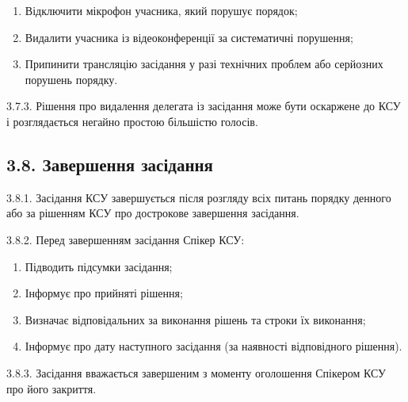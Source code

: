         \begin{enumerate}[label=\alph*)]
            \item Відключити мікрофон учасника, який порушує порядок;
            \item Видалити учасника із відеоконференції за систематичні порушення;
            \item Припинити трансляцію засідання у разі технічних проблем або серйозних порушень порядку.
        \end{enumerate}

    3.7.3. Рішення про видалення делегата із засідання може бути оскаржене до КСУ і розглядається негайно простою більшістю голосів.

\subsection*{3.8. Завершення засідання}
    3.8.1. Засідання КСУ завершується після розгляду всіх питань порядку денного або за рішенням КСУ про дострокове завершення засідання.

    3.8.2. Перед завершенням засідання Спікер КСУ:

        \begin{enumerate}[label=\alph*)]
            \item Підводить підсумки засідання;
            \item Інформує про прийняті рішення;
            \item Визначає відповідальних за виконання рішень та строки їх виконання;
            \item Інформує про дату наступного засідання (за наявності відповідного рішення).
        \end{enumerate}

    3.8.3. Засідання вважається завершеним з моменту оголошення Спікером КСУ про його закриття.